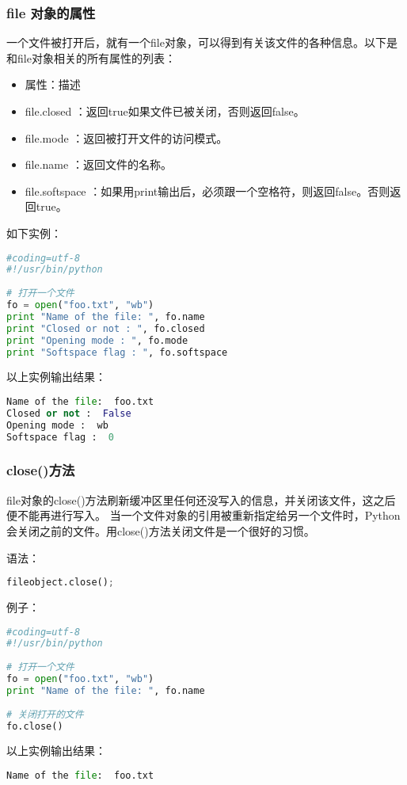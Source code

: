\subsubsection{file 对象的属性}
一个文件被打开后，就有一个file对象，可以得到有关该文件的各种信息。以下是和file对象相关的所有属性的列表：
\begin{itemize}
\item 属性：描述
\item file.closed	：返回true如果文件已被关闭，否则返回false。
\item file.mode	：返回被打开文件的访问模式。
\item file.name	：返回文件的名称。
\item file.softspace	：如果用print输出后，必须跟一个空格符，则返回false。否则返回true。
\end{itemize}
如下实例：
 \begin{lstlisting}[language=Python]
#coding=utf-8
#!/usr/bin/python
 
# 打开一个文件
fo = open("foo.txt", "wb")
print "Name of the file: ", fo.name
print "Closed or not : ", fo.closed
print "Opening mode : ", fo.mode
print "Softspace flag : ", fo.softspace
  \end{lstlisting}
以上实例输出结果：
 \begin{lstlisting}[language=Python]
Name of the file:  foo.txt
Closed or not :  False
Opening mode :  wb
Softspace flag :  0
  \end{lstlisting}



\subsubsection{close()方法}
file对象的close()方法刷新缓冲区里任何还没写入的信息，并关闭该文件，这之后便不能再进行写入。
当一个文件对象的引用被重新指定给另一个文件时，Python会关闭之前的文件。用close()方法关闭文件是一个很好的习惯。

语法：
 \begin{lstlisting}[language=Python]
 fileobject.close();
  \end{lstlisting}

例子：
 \begin{lstlisting}[language=Python]
#coding=utf-8
#!/usr/bin/python
 
# 打开一个文件
fo = open("foo.txt", "wb")
print "Name of the file: ", fo.name
 
# 关闭打开的文件
fo.close()
  \end{lstlisting}
以上实例输出结果：
 \begin{lstlisting}[language=Python]
Name of the file:  foo.txt
  \end{lstlisting}



